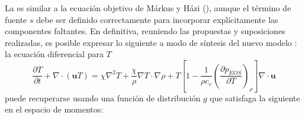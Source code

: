 La  es similar a la ecuaci\'on objetivo de M\'arkus y H\'azi (), aunque el t\'ermino de fuente $s$ debe ser definido correctamente para incorporar expl\'icitamente las componentes faltantes. En definitiva, reuniendo las propuestas y suposiciones realizadas, es posible expresar lo siguiente a modo de s\'intesis del nuevo modelo \cite{fogliatto_assessment_2021}: la ecuaci\'on diferencial para $T$
\begin{equation}
	\dfrac{\partial T}{\partial t} + \nabla \cdot (\bm{u} T) = \chi \nabla^2 T  + \dfrac{\chi}{\rho} \nabla T \cdot \nabla \rho + T \left[ 1 - \dfrac{1}{\rho c_v} \left( \dfrac{\partial p_{EOS}}{\partial T} \right)_{\rho} \right] \nabla \cdot \bm{u}
\end{equation}
puede recuperarse usando una funci\'on de distribuci\'on $g$ que satisfaga la siguiente \lbe{} en el espacio de momentos:
